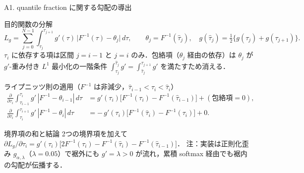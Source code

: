 \documentclass[aspectratio=169, 10pt]{beamer}
\providecommand{\Finv}{}\renewcommand{\Finv}{F^{-1}}
\newcommand{\Lg}{L_g}
\begin{document}
\begin{frame}{A1. quantile fraction に関する勾配の導出}
  \footnotesize
  \begin{block}{目的関数の分解}
    \[
      \Lg=\textstyle\sum_{j=0}^{N-1}\int_{\tau_j}^{\tau_{j+1}} g'(\tau)\,\bigl|\Finv(\tau)-\theta_j\bigr|\,d\tau,
      \qquad \theta_j=\Finv(\hat\tau_j),\quad g(\hat\tau_j)=\tfrac12\{g(\tau_j)+g(\tau_{j+1})\}.
    \]
    $\tau_i$ に依存する項は区間 $j=i-1$ と $j=i$ のみ．包絡項（$\theta_j$ 経由の依存）は
    $\theta_j$ が $g'$-重み付き $L^1$ 最小化の一階条件 $\int_{\tau_j}^{\hat\tau_j}g'=\int_{\hat\tau_j}^{\tau_{j+1}}g'$ を満たすため消える．
  \end{block}
  \begin{block}{ライプニッツ則の適用（$\Finv$ は非減少，$\hat\tau_{i-1}<\tau_i<\hat\tau_i$）}
    \begin{align*}
      \frac{\partial}{\partial\tau_i}\int_{\tau_{i-1}}^{\tau_i} g'\,|\Finv-\theta_{i-1}|\,d\tau
      &= g'(\tau_i)\bigl[\Finv(\tau_i)-\Finv(\hat\tau_{i-1})\bigr] + (\text{包絡項}=0), \\
      \frac{\partial}{\partial\tau_i}\int_{\tau_i}^{\tau_{i+1}} g'\,|\Finv-\theta_i|\,d\tau
      &= -\,g'(\tau_i)\bigl[\Finv(\hat\tau_i)-\Finv(\tau_i)\bigr] + 0 .
    \end{align*}
  \end{block}
  \begin{exampleblock}{境界項の和と結論}
    2つの境界項を加えて
    $\partial\Lg/\partial\tau_i=g'(\tau_i)\bigl[2\Finv(\tau_i)-\Finv(\hat\tau_i)-\Finv(\hat\tau_{i-1})\bigr]$．
    注：実装は正則化歪み $g_{\alpha,\lambda}$（$\lambda=0.05$）で裾外にも $g'=\lambda>0$ が流れ，累積 softmax 経由でも裾内の勾配が伝播する．
  \end{exampleblock}
\end{frame}
\end{document}
